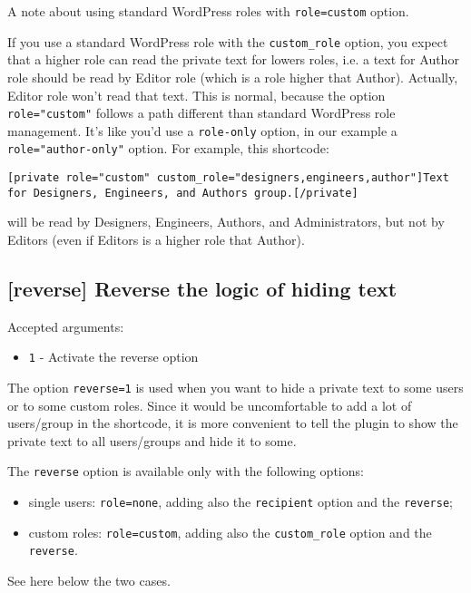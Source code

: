 \documentclass[
	titlepage,
	headinclude,
	abstract=on,
	paper=a4,
	fontsize=11pt,
]{scrartcl}
\begin{document}
A note about using standard WordPress roles with \verb+role=custom+ option.

If you use a standard WordPress role with the \verb+custom_role+ option, you expect that a higher role can read the private text for lowers roles, i.e. a text for Author role should be read by Editor role (which is a role higher that Author). Actually, Editor role won't read that text. This is normal, because the option \verb+role="custom"+ follows a path different than standard WordPress role management. It's like you'd use a \verb+role-only+ option, in our example a \verb+role="author-only"+ option. For example, this shortcode:

\begin{lstlisting}
[private role="custom" custom_role="designers,engineers,author"]Text for Designers, Engineers, and Authors group.[/private]
\end{lstlisting}

will be read by Designers, Engineers, Authors, and Administrators, but not by Editors (even if Editors is a higher role that Author).

\subsection{[reverse] Reverse the logic of hiding text}

Accepted arguments:

\begin{itemize}
 \item \verb+1+ - Activate the reverse option
\end{itemize}

The option \verb+reverse=1+ is used when you want to hide a private text to some users or to some custom roles. Since it would be uncomfortable to add a lot of users/group in the shortcode, it is more convenient to tell the plugin to show the private text to all users/groups and hide it to some.

The \verb+reverse+ option is available only with the following options:

\begin{itemize}
 \item single users: \verb+role=none+, adding also the \verb+recipient+ option and the \verb+reverse+;
 \item custom roles: \verb+role=custom+, adding also the \verb+custom_role+ option and the \verb+reverse+.
\end{itemize}

See here below the two cases.
\end{document}
